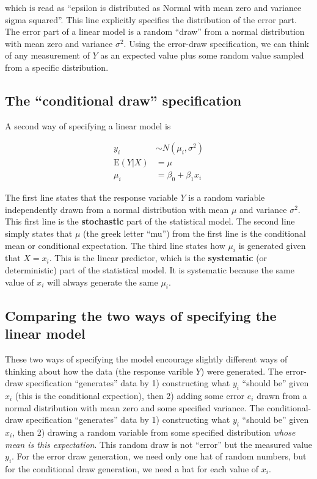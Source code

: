 \documentclass[]{book}
\begin{document}
which is read as ``epsilon is distributed as Normal with mean zero and variance sigma squared''. This line explicitly specifies the distribution of the error part. The error part of a linear model is a random ``draw'' from a normal distribution with mean zero and variance \(\sigma^2\). Using the error-draw specification, we can think of any measurement of \(Y\) as an expected value plus some random value sampled from a specific distribution.

\hypertarget{the-conditional-draw-specification}{%
\subsection{The ``conditional draw'' specification}\label{the-conditional-draw-specification}}

A second way of specifying a linear model is

\begin{align}
y_i &\sim N(\mu_i, \sigma^2)\\
\mathrm{E}(Y|X) &= \mu\\
\mu_i &= \beta_0 + \beta_1 x_i
\label{eq:lm-spec2}
\end{align}

The first line states that the response variable \(Y\) is a random variable independently drawn from a normal distribution with mean \(\mu\) and variance \(\sigma^2\). This first line is the \textbf{stochastic} part of the statistical model. The second line simply states that \(\mu\) (the greek letter ``mu'') from the first line is the conditional mean or conditional expectation. The third line states how \(\mu_i\) is generated given that \(X=x_i\). This is the linear predictor, which is the \textbf{systematic} (or deterministic) part of the statistical model. It is systematic because the same value of \(x_i\) will always generate the same \(\mu_i\).

\hypertarget{comparing-the-two-ways-of-specifying-the-linear-model}{%
\subsection{Comparing the two ways of specifying the linear model}\label{comparing-the-two-ways-of-specifying-the-linear-model}}

These two ways of specifying the model encourage slightly different ways of thinking about how the data (the response varible \(Y\)) were generated. The error-draw specification ``generates'' data by 1) constructing what \(y_i\) ``should be'' given \(x_i\) (this is the conditional expection), then 2) adding some error \(e_i\) drawn from a normal distribution with mean zero and some specified variance. The conditional-draw specification ``generates'' data by 1) constructing what \(y_i\) ``should be'' given \(x_i\), then 2) drawing a random variable from some specified distribution \emph{whose mean is this expectation}. This random draw is not ``error'' but the measured value \(y_i\). For the error draw generation, we need only one hat of random numbers, but for the conditional draw generation, we need a hat for each value of \(x_i\).
\end{document}
